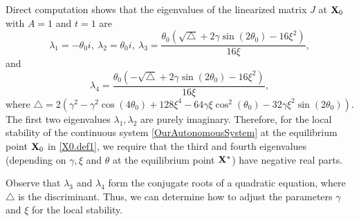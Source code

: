 \documentclass{UCF_ETD}
\begin{document}
Direct computation shows that the eigenvalues of the linearized matrix $J$ at ${\bf X}_0$ with $A=1$ and $t=1$ are
   $$\lambda_1=-\theta_0 i,\  \lambda_2= \theta_0 i,\  \lambda_3=
     \frac{\theta_0(\sqrt{\bigtriangleup} + 2\gamma\sin(2\theta_0) - 16\xi^2)}{16\xi},$$
     and
     $$\lambda_4=
     \frac{\theta_0(-\sqrt{\bigtriangleup} +2\gamma\sin(2\theta_0) - 16\xi^2)}{16\xi},$$
    where $\bigtriangleup = 2(\gamma^2 - \gamma^2\cos(4\theta_0) + 128\xi^4 - 64\gamma\xi\cos^2(\theta_0) - 32\gamma\xi^2\sin(2\theta_0)) $.
    The first two eigenvalues  $\lambda_1, \lambda_2$ are purely imaginary.
   Therefore, for the  local stability of the  continuous system \eqref{OurAutonomousSystem}
   at the equilibrium point  ${\bf X}_0$ in \eqref{X0.def1}, we require that the third and fourth eigenvalues  (depending on $\gamma, \xi$ and $\theta$
   at the equilibrium point ${\bf X}^*$)
   have negative real parts.

Observe that $\lambda_3$ and $\lambda_4$ form the conjugate roots of a quadratic equation, where $\bigtriangleup$ is the discriminant. Thus, we can 
determine how to adjust the  parameters $\gamma$ and $\xi$  for the local stability. 
\end{document}
